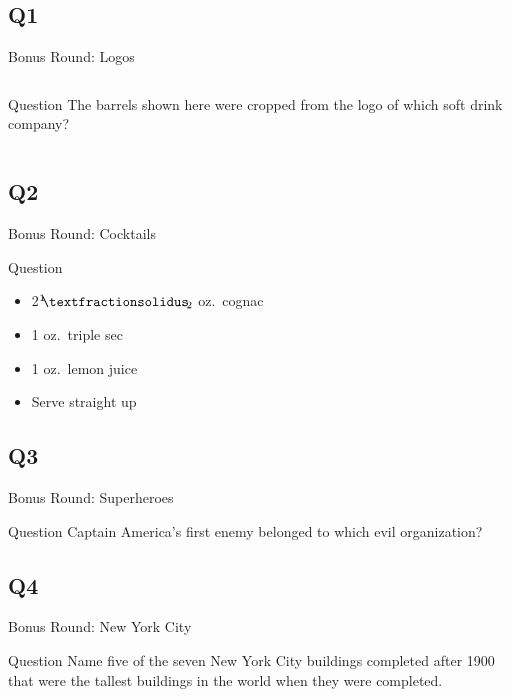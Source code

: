 \documentclass[11pt]{beamer}
\begin{document}
\subsection*{Q1}
\begin{frame}[t]{Bonus Round: Logos}
\begin{columns}[T,totalwidth=\linewidth]
\begin{column}{0.32\linewidth}
\begin{block}{Question}
The barrels shown here were cropped from the logo of which soft drink company?
\end{block}
\end{column}
\begin{column}{0.65\linewidth}
\begin{center}
\texttt{[image: \{Images/barqsicon]}.png}
\end{center}
\end{column}
\end{columns}
\end{frame}
\subsection*{Q2}
\begin{frame}[t]{Bonus Round: Cocktails}
\begin{block}{Question}
\begin{itemize}
\item 2\({}^1{\mskip -5mu⁄\mskip -3mu}_2\) oz.\ cognac
\item 1 oz.\ triple sec
\item 1 oz.\ lemon juice
\item Serve straight up
\end{itemize}
\end{block}
\end{frame}
\subsection*{Q3}
\begin{frame}[t]{Bonus Round: Superheroes}
\begin{block}{Question}
Captain America's first enemy belonged to which evil organization?
\end{block}
\end{frame}
\subsection*{Q4}
\begin{frame}[t]{Bonus Round: New York City}
\begin{block}{Question}
Name five of the seven New York City buildings completed after 1900 that were the tallest buildings in the world when they were completed. 
\end{block}
\end{frame}
\end{document}
